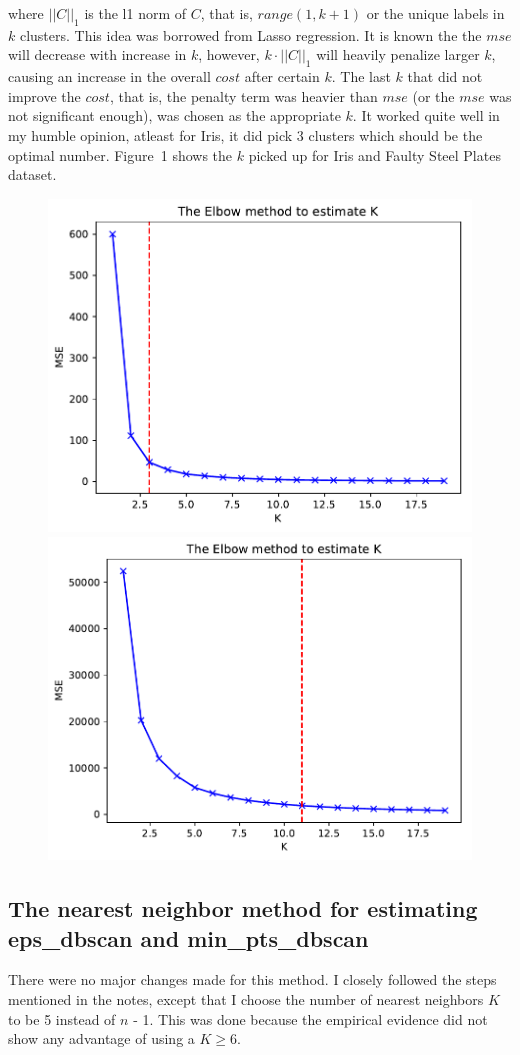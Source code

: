 \documentclass[12pt]{article}
\begin{document}
where $|| C ||_1$ is the l1 norm of $C$, that is, $range(1, k+1)$ or the unique labels in $k$ clusters. This idea was borrowed from Lasso regression. It is known the the $mse$ will decrease with increase in $k$, however, $k \cdot || C ||_1$ will heavily penalize larger $k$, causing an increase in the overall $cost$ after certain $k$. The last $k$ that did not improve the $cost$, that is, the penalty term was heavier than $mse$ (or the $mse$ was not significant enough), was chosen as the appropriate $k$. It worked quite well in my humble opinion, atleast for Iris, it did pick 3 clusters which should be the optimal number. Figure~1 shows the $k$ picked up for Iris and Faulty Steel Plates dataset.

\begin{figure}
\begin{minipage}{\linewidth}
\includegraphics[width=0.5\linewidth]{Iris_elbow_determination_k.pdf}
\includegraphics[width=0.5\linewidth]{Fault_Steel_Plates_elbow_determination_k.pdf}
\end{minipage}
\end{figure} 

\subsection*{The nearest neighbor method for estimating eps\_dbscan and min\_pts\_dbscan}

There were no major changes made for this method. I closely followed the steps mentioned in the notes, except that I choose the number of nearest neighbors $K$ to be 5 instead of $n$ - 1. This was done because the empirical evidence did not show any advantage of using a $K \geq 6$.
\end{document}
